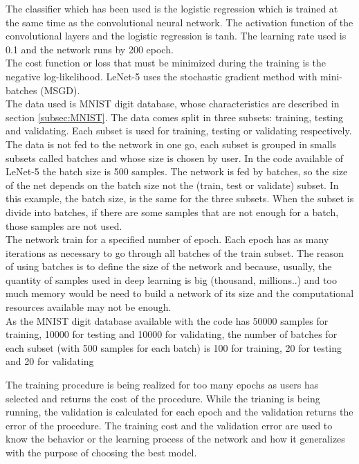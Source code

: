 The classifier which has been used is the logistic regression which is trained at the same time as the convolutional neural network. The activation function of the convolutional layers and the logistic regression is tanh. The learning rate used is 0.1 and the network runs by 200 epoch.\\

The cost function or loss that must be minimized during the training is the negative log-likelihood. LeNet-5 uses the stochastic gradient method with mini-batches (MSGD).\\

The data used is MNIST digit database, whose characteristics are described in section \ref{subsec:MNIST}. The data comes split in three subsets: training, testing and validating. Each subset is used for training, testing or validating respectively.\\

The data is not fed to the network in one go, each subset is grouped in smalls subsets called batches and whose size is chosen by user. In the code available of LeNet-5 the batch size is 500 samples. The network is fed by batches, so the size of the net depends on the batch size not the (train, test or validate) subset. In this example, the batch size, is the same for the three subsets. When the subset is divide into batches, if there are some samples that are not enough for a batch, those samples are not used.\\

The network train for a specified number of epoch. Each epoch has as many iterations as necessary to go through all batches of the train subset. The reason of using batches is to define the size of the network and because, usually, the quantity of samples used in deep learning is big (thousand, millions..) and too much memory would be need to build a network of its size and the computational resources available may not be enough.\\

As the MNIST digit database available with the code has 50000 samples for training, 10000 for testing and 10000 for validating, the number of batches for each subset (with 500 samples for each batch) is 100 for training, 20 for testing and 20 for validating

The training procedure is being realized for too many epochs as users has selected and returns the cost of the procedure. While the trianing is being running, the validation is calculated for each epoch and the validation returns the error of the procedure. The training cost and the validation error are used to know the behavior or the learning process of the network and how it generalizes with the purpose of choosing the best model.\\

